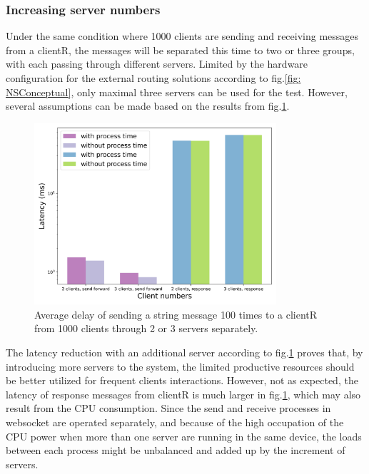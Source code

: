 \subsubsection{Increasing server numbers}
Under the same condition where 1000 clients are sending and receiving messages from 
a clientR, the messages will be separated this time to two or three groups, with 
each passing through different servers. Limited by the hardware configuration 
for the external routing solutions according to fig.\ref{fig: NSConceptual}, only 
maximal three servers can be used for the test. However, several assumptions 
can be made based on the results from fig.\ref{fig: proportional-servers}. 


\begin{figure}[htb]
    \centering
    \includegraphics[width=0.8\textwidth]{figures/tests/proportional_tests/Average_string_messages_receiving_time_of_100_tests_diff_server_numbers.png}\hfill 
    \caption{Average delay of sending a string message 100 times 
    to a clientR from 1000 clients through 2 or 3 servers separately. 
    \label{fig: proportional-servers}}
\end{figure}

The latency reduction with an additional server according to 
fig.\ref{fig: proportional-servers} proves that, by introducing more servers 
to the system, the limited productive resources should be better utilized 
for frequent clients interactions. However, not as expected, the latency of 
response messages from clientR is much larger in fig.\ref{fig: proportional-servers},
which may also result from the CPU consumption. Since the send and receive 
processes in websocket are operated separately, and because of the high 
occupation of the CPU power when more than one server are running in the same 
device, the loads between each process might be unbalanced and added up by the 
increment of servers. 


